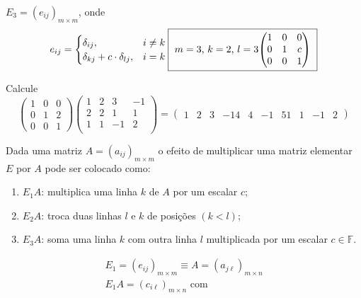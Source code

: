 \begin{definition}
\begin{enumerate}
          $E_{3}={\left(e_{ij}\right)}_{m\times m}$, onde
          \[
            e_{ij}=
            \begin{cases}
              \delta_{i j},                  & i\neq k \\
              \delta_{kj}+c\cdot\delta_{lj}, & i=k
            \end{cases}
            \fbox{
              $m=3$, $k=2$, $l=3$ \\
              \begin{math}
                \begin{pmatrix}
                  1 & 0 & 0 \\
                  0 & 1 & c \\
                  0 & 0 & 1
                \end{pmatrix}
              \end{math}
            }
          \]
  \end{enumerate}
\end{definition}

\begin{example}
  Calcule
  \[
    \begin{pmatrix}
      1 & 0 & 0 \\
      0 & 1 & 2 \\
      0 & 0 & 1
    \end{pmatrix}
    \begin{pmatrix}
      1 & 2 & 3  & -1 \\
      2 & 2 & 1  & 1  \\
      1 & 1 & -1 & 2  \\
    \end{pmatrix}=
    \begin{pmatrix}
      1 & 2 & 3  & -1
      4 & 4 & -1 & 5
      1 & 1 & -1 & 2
    \end{pmatrix}
  \]
\end{example}
Dada uma matriz $A={\left(a_{ij}\right)}_{m\times m}$ o efeito de multiplicar uma matriz elementar $E$ por $A$ pode ser colocado como:
\begin{enumerate}
  \item

        $E_{1}A$: multiplica uma linha $k$ de $A$ por um escalar $c$;

  \item

        $E_{2}A$: troca duas linhas $l$ e $k$ de posições
        $\left(k<l\right)$;

  \item

        $E_{3}A$: soma uma linha $k$ com outra linha $l$ multiplicada por um escalar $c\in\mathbb{F}$.
\end{enumerate}
\[
  \begin{array}{l}
    E_{1}=\left(e_{i j}\right)_{m \times m} \equiv A=\left(a_{j \ell}\right)_{m \times n} \\
    E_{1} A=\left(c_{i \ell}\right)_{m \times n} \text { com }
  \end{array}
\]